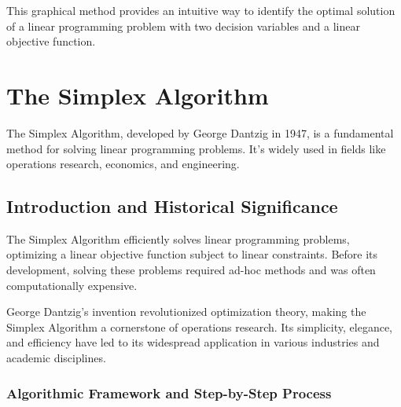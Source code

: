 \documentclass[12pt]{book} %
\begin{document}
This graphical method provides an intuitive way to identify the optimal solution of a linear programming problem with two decision variables and a linear objective function.


\section{The Simplex Algorithm}

The Simplex Algorithm, developed by George Dantzig in 1947, is a fundamental method for solving linear programming problems. It's widely used in fields like operations research, economics, and engineering.

\subsection{Introduction and Historical Significance}

The Simplex Algorithm efficiently solves linear programming problems, optimizing a linear objective function subject to linear constraints. Before its development, solving these problems required ad-hoc methods and was often computationally expensive.

George Dantzig's invention revolutionized optimization theory, making the Simplex Algorithm a cornerstone of operations research. Its simplicity, elegance, and efficiency have led to its widespread application in various industries and academic disciplines.


\subsubsection{Algorithmic Framework and Step-by-Step Process}
\end{document}
